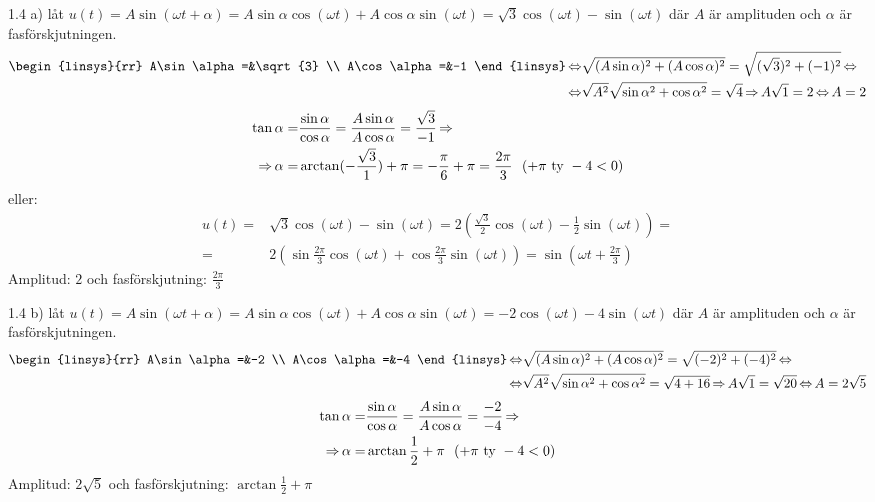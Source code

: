 \pagebreak
\begin{task}{1.4 a)}
	låt $u(t)=A\sin(\omega t + \alpha)=A\sin\alpha\cos(\omega t)+A\cos\alpha\sin(\omega t)=\sqrt{3}\cos(\omega t)-\sin(\omega t)$ där $A$ är amplituden och $\alpha$ är fasförskjutningen.
	\begin{align*}
		\begin{linsys}{rr}
		A\sin\alpha=&\sqrt{3} \\
		A\cos\alpha=&-1
		\end{linsys} \lra &
		\sqrt{(A\sin\alpha)^2+(A\cos\alpha)^2}=\sqrt{(\sqrt{3})^2+(-1)^2} \lra \\ \lra
		& \sqrt{A^2}\sqrt{\sin\alpha^2+\cos\alpha^2}=\sqrt{4} \ra
		A\sqrt{1}=2 \lra
		A=2
	\end{align*}
	\begin{align*}
		\tan\alpha= &
		\frac{\sin\alpha}{\cos\alpha}=
		\frac{A\sin\alpha}{A\cos\alpha}=
		\frac{\sqrt{3}}{-1} \operatorname{\Rightarrow} \\ \operatorname{\Rightarrow}
		\alpha= &
		\arctan(-\frac{\sqrt{3}}{1})+\pi=
		-\frac{\pi}{6}+\pi=
		\frac{2\pi}{3}~~(+\pi \text{ ty } -4<0)
	\end{align*}
	eller:
	\begin{align*}
		u(t)= &
		\sqrt{3}\cos(\omega t)-\sin(\omega t)=
		2(\frac{\sqrt{3}}{2}\cos(\omega t)-\frac{1}{2}\sin(\omega t))= \\ =
		& 2(\sin\frac{2\pi}{3}\cos(\omega t)+\cos\frac{2\pi}{3}\sin(\omega t))=
		\sin(\omega t + \frac{2\pi}{3})
	\end{align*}
	\ans Amplitud: $2$ och fasförskjutning: $\frac{2\pi}{3}$
\end{task}

\begin{task}{1.4 b)}
	låt $u(t)=A\sin(\omega t + \alpha)=A\sin\alpha\cos(\omega t)+A\cos\alpha\sin(\omega t)=-2\cos(\omega t)-4\sin(\omega t)$ där $A$ är amplituden och $\alpha$ är fasförskjutningen.
	\begin{align*}
	\begin{linsys}{rr}
	A\sin\alpha=&-2 \\
	A\cos\alpha=&-4
	\end{linsys} \lra &
	\sqrt{(A\sin\alpha)^2+(A\cos\alpha)^2}=\sqrt{(-2)^2+(-4)^2} \lra \\ \lra
	& \sqrt{A^2}\sqrt{\sin\alpha^2+\cos\alpha^2}=\sqrt{4+16} \ra
	A\sqrt{1}=\sqrt{20} \lra
	A=2\sqrt{5}
	\end{align*}
	\begin{align*}
	\tan\alpha= &
	\frac{\sin\alpha}{\cos\alpha}=
	\frac{A\sin\alpha}{A\cos\alpha}=
	\frac{-2}{-4} \operatorname{\Rightarrow} \\ \operatorname{\Rightarrow}
	\alpha= &
	\arctan\frac{1}{2}+\pi~~(+\pi \text{ ty } -4<0)
	\end{align*}
	\ans Amplitud: $2\sqrt{5}$ och fasförskjutning: $\arctan\frac{1}{2}+\pi$
\end{task}

